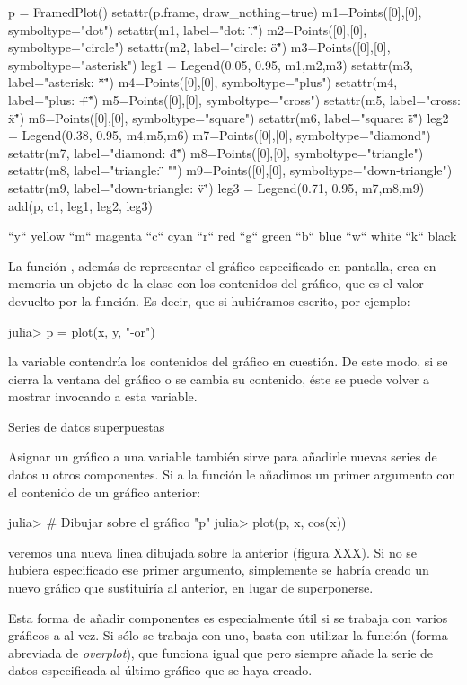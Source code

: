 ﻿\documentclass[spanish]{article}
\begin{document}
p = FramedPlot()
setattr(p.frame, draw_nothing=true)
m1=Points([0],[0], symboltype="dot")
setattr(m1, label="dot: \".\"")
m2=Points([0],[0], symboltype="circle")
setattr(m2, label="circle: \"o\"")
m3=Points([0],[0], symboltype="asterisk")
leg1 = Legend(0.05, 0.95, {m1,m2,m3})
setattr(m3, label="asterisk: \"*\"")
m4=Points([0],[0], symboltype="plus")
setattr(m4, label="plus: \"+\"")
m5=Points([0],[0], symboltype="cross")
setattr(m5, label="cross: \"x\"")
m6=Points([0],[0], symboltype="square")
setattr(m6, label="square: \"s\"")
leg2 = Legend(0.38, 0.95, {m4,m5,m6})
m7=Points([0],[0], symboltype="diamond")
setattr(m7, label="diamond: \"d\"")
m8=Points([0],[0], symboltype="triangle")
setattr(m8, label="triangle: \"^^\"")
m9=Points([0],[0], symboltype="down-triangle")
setattr(m9, label="down-triangle: \"v\"")
leg3 = Legend(0.71, 0.95, {m7,m8,m9})
add(p, c1, leg1, leg2, leg3)

``y``     yellow
``m``     magenta
``c``     cyan
``r``     red
``g``     green
``b``     blue
``w``     white
``k``     black

La función , además de representar el gráfico especificado en pantalla, crea en memoria un objeto de la clase  con los contenidos del gráfico, que es el valor devuelto por la función. Es decir, que si hubiéramos escrito, por ejemplo:

julia> p = plot(x, y, "-or")

la variable  contendría los contenidos del gráfico en cuestión. De este modo, si se cierra la ventana del gráfico o se cambia su contenido, éste se puede volver a mostrar invocando a esta variable.


Series de datos superpuestas

Asignar un gráfico a una variable también sirve para añadirle nuevas series de datos u otros componentes. Si a la función  le añadimos un primer argumento con el contenido de un gráfico anterior:

julia> # Dibujar sobre el gráfico "p"
julia> plot(p, x, cos(x))

veremos una nueva linea dibujada sobre la anterior (figura XXX). Si no se hubiera especificado ese primer argumento, simplemente se habría creado un nuevo gráfico que sustituiría al anterior, en lugar de superponerse.

Esta forma de añadir componentes es especialmente útil si se trabaja con varios gráficos a al vez. Si sólo se trabaja con uno, basta con utilizar la función  (forma abreviada de \emph{overplot}), que funciona igual que  pero siempre añade la serie de datos especificada al último gráfico que se haya creado.
\end{document}
